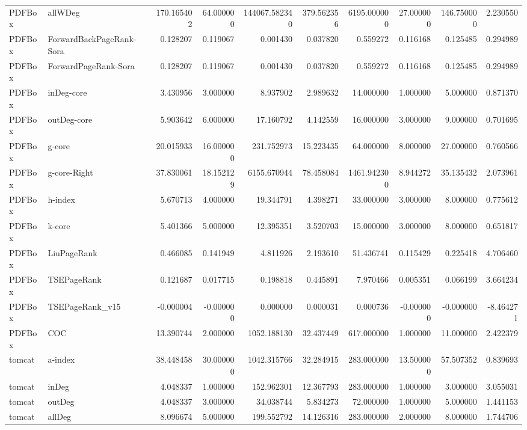 \begin{tabular}{llrrrrrrrr}
PDFBox & allWDeg & 170.165402 & 64.000000 & 144067.582340 & 379.562356 & 6195.000000 & 27.000000 & 146.750000 & 2.230550 \\
PDFBox & ForwardBackPageRank-Sora & 0.128207 & 0.119067 & 0.001430 & 0.037820 & 0.559272 & 0.116168 & 0.125485 & 0.294989 \\
PDFBox & ForwardPageRank-Sora & 0.128207 & 0.119067 & 0.001430 & 0.037820 & 0.559272 & 0.116168 & 0.125485 & 0.294989 \\
PDFBox & inDeg-core & 3.430956 & 3.000000 & 8.937902 & 2.989632 & 14.000000 & 1.000000 & 5.000000 & 0.871370 \\
PDFBox & outDeg-core & 5.903642 & 6.000000 & 17.160792 & 4.142559 & 16.000000 & 3.000000 & 9.000000 & 0.701695 \\
PDFBox & g-core & 20.015933 & 16.000000 & 231.752973 & 15.223435 & 64.000000 & 8.000000 & 27.000000 & 0.760566 \\
PDFBox & g-core-Right & 37.830061 & 18.152129 & 6155.670944 & 78.458084 & 1461.942300 & 8.944272 & 35.135432 & 2.073961 \\
PDFBox & h-index & 5.670713 & 4.000000 & 19.344791 & 4.398271 & 33.000000 & 3.000000 & 8.000000 & 0.775612 \\
PDFBox & k-core & 5.401366 & 5.000000 & 12.395351 & 3.520703 & 15.000000 & 3.000000 & 8.000000 & 0.651817 \\
PDFBox & LiuPageRank & 0.466085 & 0.141949 & 4.811926 & 2.193610 & 51.436741 & 0.115429 & 0.225418 & 4.706460 \\
PDFBox & TSEPageRank & 0.121687 & 0.017715 & 0.198818 & 0.445891 & 7.970466 & 0.005351 & 0.066199 & 3.664234 \\
PDFBox & TSEPageRank_v15 & -0.000004 & -0.000000 & 0.000000 & 0.000031 & 0.000736 & -0.000000 & -0.000000 & -8.464271 \\
PDFBox & COC & 13.390744 & 2.000000 & 1052.188130 & 32.437449 & 617.000000 & 1.000000 & 11.000000 & 2.422379 \\
tomcat & a-index & 38.448458 & 30.000000 & 1042.315766 & 32.284915 & 283.000000 & 13.500000 & 57.507352 & 0.839693 \\
tomcat & inDeg & 4.048337 & 1.000000 & 152.962301 & 12.367793 & 283.000000 & 1.000000 & 3.000000 & 3.055031 \\
tomcat & outDeg & 4.048337 & 3.000000 & 34.038744 & 5.834273 & 72.000000 & 1.000000 & 5.000000 & 1.441153 \\
tomcat & allDeg & 8.096674 & 5.000000 & 199.552792 & 14.126316 & 283.000000 & 2.000000 & 8.000000 & 1.744706 \\

\end{tabular}
